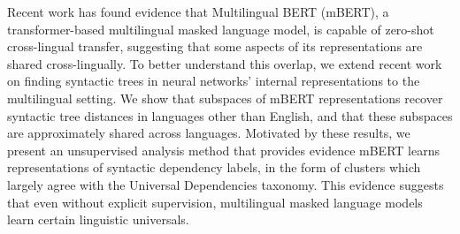 Recent work has found evidence that Multilingual BERT (mBERT), a transformer-based multilingual masked language model, is capable of zero-shot cross-lingual transfer, suggesting that some aspects of its representations are shared cross-lingually. To better understand this overlap, we extend recent work on finding syntactic trees in neural networks' internal representations to the multilingual setting. We show that subspaces of mBERT representations recover syntactic tree distances in languages other than English, and that these subspaces are approximately shared across languages. Motivated by these results, we present an unsupervised analysis method that provides evidence mBERT learns representations of syntactic dependency labels, in the form of clusters which largely agree with the Universal Dependencies taxonomy. This evidence suggests that even without explicit supervision, multilingual masked language models learn certain linguistic universals.
